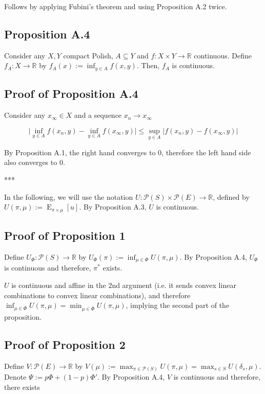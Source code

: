 \documentclass[a4paper]{article}
\DeclareMathOperator{\E}{E}
\newcommand{\Reals}{\mathbb{R}}
\newcommand{\Abs}[1]{\lvert #1 \rvert}
\newcommand{\Prob}{\mathcal{P}}
\begin{document}
Follows by applying Fubini's theorem and using Proposition A.2 twice.

\subsection{Proposition A.4}

Consider any ${X,Y}$ compact Polish, ${A \subseteq Y}$ and ${f: X \times Y \rightarrow \Reals}$ continuous. Define ${f_A: X \rightarrow \Reals}$ by ${f_A(x):= \inf_{y \in A} f(x,y)}$. Then, ${f_A}$ is continuous.

\subsection{Proof of Proposition A.4}

Consider any ${x_\infty \in X}$ and a sequence ${x_n \rightarrow x_\infty}$

$$\Abs{\inf_{y \in A} f(x_n,y) - \inf_{y \in A} f(x_\infty,y)} \leq \sup_{y \in A} \Abs{f(x_n,y) - f(x_\infty,y)}$$

By Proposition A.1, the right hand converges to 0, therefore the left hand side also converges to 0.

***

In the following, we will use the notation ${U: \Prob(S) \times \Prob(E) \rightarrow \Reals}$, defined by ${U(\pi,\mu):=\E_{\pi \times \mu}[u]}$. By Proposition A.3, ${U}$ is continuous. 

\subsection{Proof of Proposition 1}

Define ${U_\Phi: \Prob(S) \rightarrow \Reals}$ by ${U_\Phi(\pi):= \inf_{\mu \in \Phi} U(\pi,\mu)}$. By Proposition A.4, ${U_{\Phi}}$ is continuous and therefore, ${\pi^*}$ exists.

${U}$ is continuous and affine in the 2nd argument (i.e. it sends convex linear combinations to convex linear combinations), and therefore ${\inf_{\mu \in \Phi} U(\pi,\mu)=\min_{\mu \in \bar{\Phi}} U(\pi,\mu)}$, implying the second part of the proposition.

\subsection{Proof of Proposition 2}

Define ${V: \Prob(E) \rightarrow \Reals}$ by ${V(\mu):=\max_{\pi \in \Prob(S)} U(\pi,\mu)=\max_{s \in S} U(\delta_s,\mu)}$. Denote ${\Psi:=p\Phi + (1-p)\Phi'}$. By Proposition A.4, ${V}$ is continuous and therefore, there exists
\end{document}
